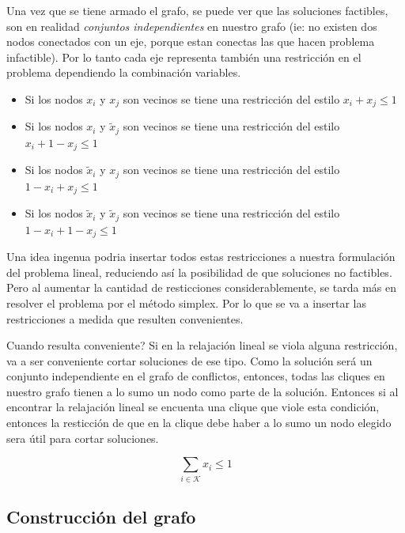 Una vez que se tiene armado el grafo, se puede ver que las soluciones factibles, son en realidad \emph{conjuntos independientes} en nuestro grafo
(ie: no existen dos nodos conectados con un eje, porque estan conectas las que hacen problema infactible). Por lo tanto cada eje representa
tambi\'en una restricci\'on en el problema dependiendo la combinaci\'on variables.

\begin{itemize}
\item Si los nodos $x_i$ y $x_j$ son vecinos se tiene una restricci\'on del estilo $x_i +x_j \leq 1$
\item Si los nodos $x_i$ y $\tilde{x}_j$ son vecinos se tiene una restricci\'on del estilo $x_i + 1-x_j \leq 1$
\item Si los nodos $\tilde{x}_i$ y $x_j$ son vecinos se tiene una restricci\'on del estilo $1-x_i +x_j \leq 1$
\item Si los nodos $\tilde{x}_i$ y $\tilde{x}_j$ son vecinos se tiene una restricci\'on del estilo $1-x_i + 1-x_j \leq 1$
\end{itemize}

Una idea ingenua podria insertar todos estas restricciones a nuestra formulaci\'on del problema lineal, reduciendo as\'i la posibilidad de que soluciones no factibles.
Pero al aumentar la cantidad de resticciones considerablemente, se tarda m\'as en resolver el problema por el m\'etodo simplex. Por lo que se va
a insertar las restricciones a medida que resulten convenientes.

Cuando resulta conveniente? Si en la relajaci\'on lineal se viola alguna restricci\'on, va a ser conveniente cortar soluciones de ese tipo.
Como la soluci\'on ser\'a un conjunto independiente en el grafo de conflictos, entonces, todas las cliques en nuestro grafo tienen a lo sumo
un nodo como parte de la soluci\'on. Entonces si al encontrar la relajaci\'on lineal se encuenta una clique que viole esta condici\'on, entonces
la resticci\'on de que en la clique debe haber a lo sumo un nodo elegido sera \'util para cortar soluciones.

\begin{equation} \label{eq3}
\sum\limits_{i \in \mathcal{K}} x_i \leq 1
\end{equation}

\bigskip
\subsection{Construcci\'on del grafo}

